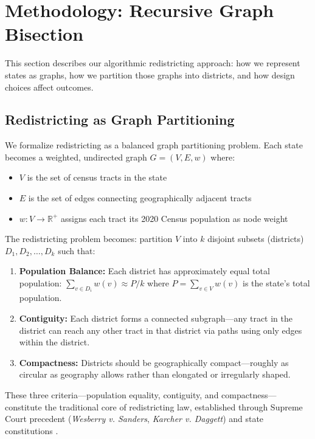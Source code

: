 \section{Methodology: Recursive Graph Bisection}
\label{sec:methodology}

This section describes our algorithmic redistricting approach: how we represent states as graphs, how we partition those graphs into districts, and how design choices affect outcomes.

\subsection{Redistricting as Graph Partitioning}

We formalize redistricting as a balanced graph partitioning problem. Each state becomes a weighted, undirected graph $G = (V, E, w)$ where:

\begin{itemize}
    \item $V$ is the set of census tracts in the state
    \item $E$ is the set of edges connecting geographically adjacent tracts
    \item $w: V \to \mathbb{R}^+$ assigns each tract its 2020 Census population as node weight
\end{itemize}

The redistricting problem becomes: partition $V$ into $k$ disjoint subsets (districts) $D_1, D_2, \ldots, D_k$ such that:

\begin{enumerate}
    \item \textbf{Population Balance:} Each district has approximately equal total population: $\sum_{v \in D_i} w(v) \approx P/k$ where $P = \sum_{v \in V} w(v)$ is the state's total population.

    \item \textbf{Contiguity:} Each district forms a connected subgraph—any tract in the district can reach any other tract in that district via paths using only edges within the district.

    \item \textbf{Compactness:} Districts should be geographically compact—roughly as circular as geography allows rather than elongated or irregularly shaped.
\end{enumerate}

These three criteria—population equality, contiguity, and compactness—constitute the traditional core of redistricting law, established through Supreme Court precedent (\textit{Wesberry v. Sanders}, \textit{Karcher v. Daggett}) and state constitutions \cite{wesberry1964,karcher1983}.


